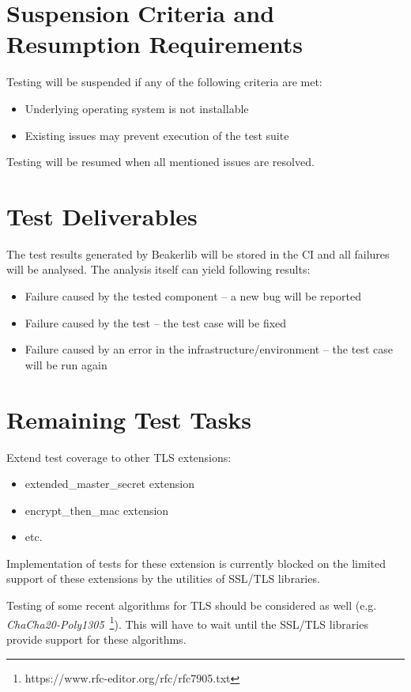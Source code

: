 \section{Suspension Criteria and Resumption Requirements}
    Testing will be suspended if any of the following criteria are met:
    \begin{itemize}
        \item Underlying operating system is not installable
        \item Existing issues may prevent execution of the test suite
    \end{itemize}

    Testing will be resumed when all mentioned issues are resolved.

\section{Test Deliverables}
    The test results generated by Beakerlib will be stored in the CI and
    all failures will be analysed. The analysis itself can yield following
    results:

    \begin{itemize}
        \item Failure caused by the tested component -- a new bug will be reported
        \item Failure caused by the test -- the test case will be fixed
        \item Failure caused by an error in the infrastructure/environment --
              the test case will be run again
    \end{itemize}

\section{Remaining Test Tasks}
    Extend test coverage to other TLS extensions:
    \begin{itemize}
        \item extended\_master\_secret extension
        \item encrypt\_then\_mac extension
        \item etc.
    \end{itemize}

    Implementation of tests for these extension is currently blocked on the
    limited support of these extensions by the utilities of SSL/TLS libraries.

    Testing of some recent algorithms for TLS should be considered as well
    (e.g. \textit{ChaCha20-Poly1305}~\footnote{https://www.rfc-editor.org/rfc/rfc7905.txt}).
    This will have to wait until the SSL/TLS libraries provide support for
    these algorithms.


